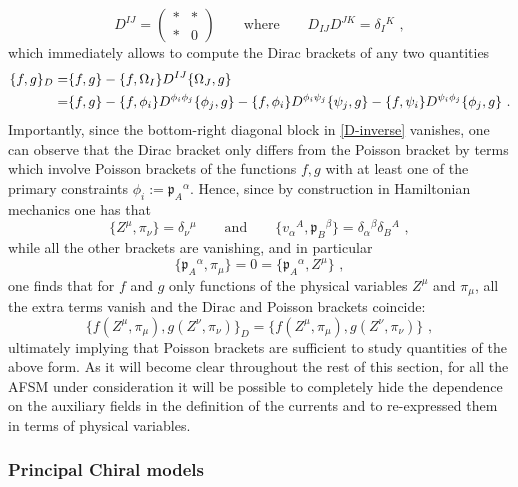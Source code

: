 \documentclass[12pt]{article}
\numberwithin{equation}{section}
\begin{document}
\begin{equation}\label{D-inverse}
D^{IJ}= 
\begin{pmatrix}
* & * \\
* & 0
\end{pmatrix}
\qquad \text{where} \qquad 
D_{IJ}D^{JK}=\delta_{I}{}^{K} \,\, ,
\end{equation}
which immediately allows to compute the Dirac brackets of any two quantities
\begin{align}
\{f,g\}_{D}=&\{f,g\}-\{f,\Omega_{I}\} D^{IJ}\{\Omega_{J},g\}
\\
=&\{f,g\}-\{f,\phi_{i}\}D^{\phi_{i}\phi_{j}}\{\phi_{j},g\}-\{f,\phi_{i}\}D^{\phi_{i}\psi_{j}}\{\psi_{j},g\}-\{f,\psi_{i}\}D^{\psi_{i}\phi_{j}}\{\phi_{j},g\} \,\, .
\notag 
\end{align}
Importantly, since the bottom-right diagonal block in \eqref{D-inverse} vanishes, one can observe that the Dirac bracket only differs from the Poisson bracket by terms which involve Poisson brackets of the functions $f,g$ with at least one of the primary constraints $\phi_{i}:=\mathfrak{p}_{A}{}^{\alpha}$. Hence, since by construction in Hamiltonian mechanics one has that
\begin{equation}
\{Z^{\mu},\pi_{\nu}\}=\delta_{\nu}{}^{\mu} \qquad \text{and} \qquad \{v_{\alpha}{}^{A},\mathfrak{p}_{B}{}^{\beta}\}=\delta_{\alpha}{}^{\beta}\delta_{B}{}^{A} \,\, ,
\end{equation}
while all the other brackets are vanishing, and in particular 
\begin{equation}
\{\mathfrak{p}_{A}{}^{\alpha},\pi_{\mu}\}=0=\{\mathfrak{p}_{A}{}^{\alpha},Z^{\mu}\} \,\, ,
\end{equation}
one finds that for $f$ and $g$ only functions of the physical variables $Z^{\mu}$ and $\pi_{\mu}$, all the extra terms vanish and the Dirac and Poisson brackets coincide:
\begin{equation}
\{f(Z^{\mu},\pi_{\mu}),g(Z^{\nu},\pi_{\nu})\}_{D}=\{f(Z^{\mu},\pi_{\mu}),g(Z^{\nu},\pi_{\nu})\} \,\, ,
\end{equation}
ultimately implying that Poisson brackets are sufficient to study quantities of the above form. As it will become clear throughout the rest of this section, for all the AFSM under consideration it will be possible to completely hide the dependence on the auxiliary fields in the definition of the currents and to re-expressed them in terms of physical variables.



\subsubsection{Principal Chiral models}\label{subsubsec:PCM}
\end{document}
